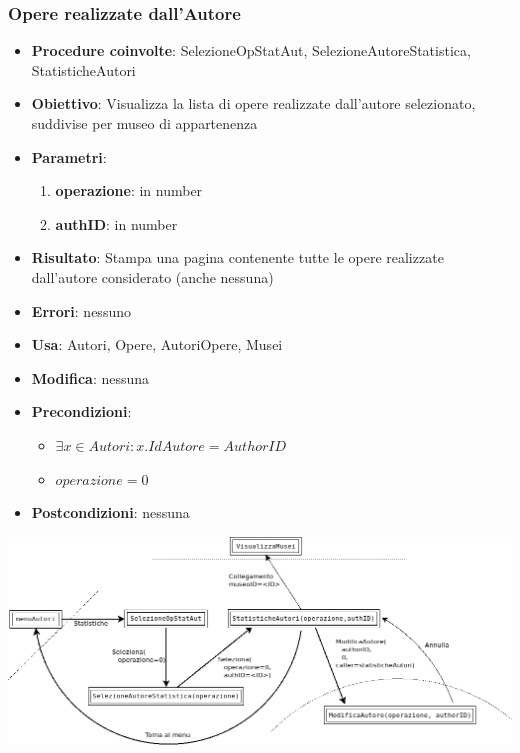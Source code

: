 \subsubsection{Opere realizzate dall’Autore}
\label{OpereRealizzate}
\begin{itemize}
	\item \textbf{Procedure coinvolte}: SelezioneOpStatAut, SelezioneAutoreStatistica, StatisticheAutori
	\item \textbf{Obiettivo}: Visualizza la lista di opere realizzate dall'autore selezionato, suddivise per museo di appartenenza
	\item \textbf{Parametri}:
	\begin{enumerate}
		\item \textbf{operazione}: in number
		\item \textbf{authID}: in number
	\end{enumerate}
	\item \textbf{Risultato}: Stampa una pagina contenente tutte le opere realizzate dall'autore considerato (anche nessuna)
	\item \textbf{Errori}: nessuno
	\item \textbf{Usa}: Autori, Opere, AutoriOpere, Musei
	\item \textbf{Modifica}: nessuna
	\item \textbf{Precondizioni}:
	\begin{itemize}
		\item $\exists x \in Autori : x.IdAutore = AuthorID$
		\item $operazione  = 0$
	\end{itemize}
	\item \textbf{Postcondizioni}: nessuna
\end{itemize}
\includegraphics[width=\textwidth]{img/statAutori-0.png}\\[1cm]


